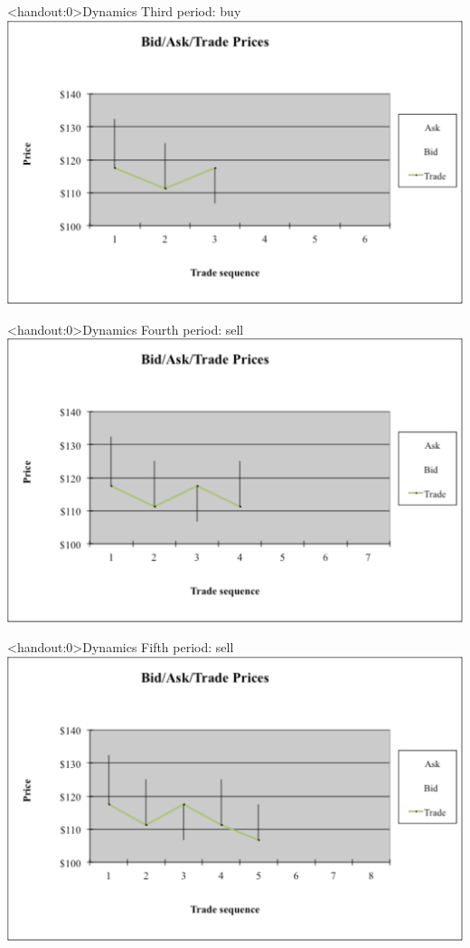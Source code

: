 \documentclass[english,10pt]{beamer}
\begin{document}
\begin{frame}<handout:0>{Dynamics}
	Third period: buy
	\center
	\includegraphics[width=0.9\linewidth]{pics/P3_Image.pdf}
\end{frame}


\begin{frame}<handout:0>{Dynamics}
	Fourth period: sell
	\center
	\includegraphics[width=0.9\linewidth]{pics/P4_Image.pdf}
\end{frame}


\begin{frame}<handout:0>{Dynamics}
	Fifth period: sell
	\center
	\includegraphics[width=0.9\linewidth]{pics/P5_Image.pdf}
\end{frame}
\end{document}
